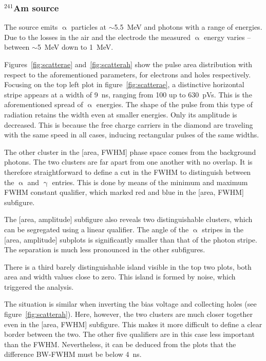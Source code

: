  

\subsubsection{$^{241}$Am source}
The source emits $\upalpha$ particles at $\sim$5.5~MeV and photons with a range of energies. Due to the losses in the air and the electrode the measured $\upalpha$ energy varies -- between $\sim$5~MeV down to 1~MeV. 

Figures~\ref{fig:scatterae} and~\ref{fig:scatterah} show the pulse area distribution with respect to the aforementioned parameters, for electrons and holes respectively. 
Focusing on the top left plot in figure~\ref{fig:scatterae}, a distinctive horizontal stripe appears at a width of 9~ns, ranging from 100 up to 630~pVs. This is the aforementioned spread of $\upalpha$ energies. The shape of the pulse from this type of radiation retains the width even at smaller energies. Only its amplitude is decreased. This is because the free charge carriers in the diamond are traveling with the same speed in all cases, inducing rectangular pulses of the same widths. 

The other cluster in the [area, FWHM] phase space comes from the background photons. The two clusters are far apart from one another with no overlap. It is therefore straightforward to define a cut in the FWHM to distinguish between the $\upalpha$ and $\upgamma$ entries. This is done by means of the minimum and maximum FWHM constant qualifier, which marked red and blue in the [area, FWHM] subfigure.

The [area, amplitude] subfigure also reveals two distinguishable clusters, which can be segregated using a linear qualifier. The angle of the $\upalpha$ stripes in the [area, amplitude] subplots is significantly smaller than that of the photon stripe. The separation is much less pronounced in the other subfigures. 

There is a third barely distinguishable island visible in the top two plots, both area and width values close to zero. This island is formed by noise, which triggered the analysis.

The situation is similar when inverting the bias voltage and collecting holes (see figure~\ref{fig:scatterah}). Here, however, the two clusters are much closer together even in the [area, FWHM] subfigure. This makes it more difficult to define a clear border between the two. The other five qualifiers are in this case less important than the FWHM. Nevertheless, it can be deduced from the plots that the difference BW-FWHM must be below 4~ns.

